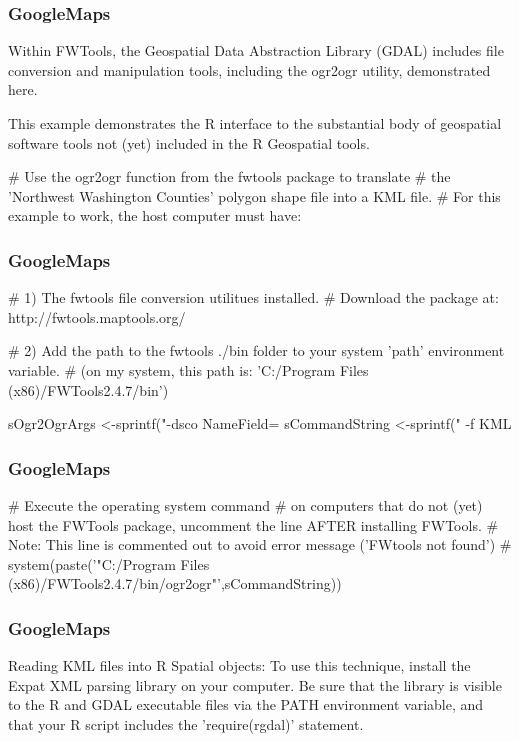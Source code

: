 \documentclass{beamer}
\begin{document}
\begin{frame}[fragile]
\frametitle{GoogleMaps}
Within FWTools, the Geospatial Data Abstraction Library (GDAL) includes file conversion and manipulation tools, including the ogr2ogr utility, demonstrated here.

This example demonstrates the R interface to the substantial body of geospatial software tools not (yet) included in the R Geospatial tools.

# Use the ogr2ogr function from the fwtools package to translate 
# the 'Northwest Washington Counties' polygon shape file into a KML file.
# For this example to work, the host computer must have: 
\end{frame}
\begin{frame}[fragile]
\frametitle{GoogleMaps}
 
# 1) The fwtools file conversion utilitues installed. 
#    Download the package at:   http://fwtools.maptools.org/

# 2) Add the path to the fwtools ./bin folder to your system 'path' environment variable.
#    (on my system, this path is: 'C:/Program Files (x86)/FWTools2.4.7/bin')

   sOgr2OgrArgs <-sprintf("-dsco NameField=%
   sCommandString <-sprintf(" -f KML %
\end{frame}
\begin{frame}[fragile]
\frametitle{GoogleMaps}

# Execute the operating system command
# on computers that do not (yet) host the FWTools package, uncomment the line AFTER installing FWTools.
# Note: This line is commented out to avoid error message ('FWtools not found')   
#   system(paste('"C:/Program Files (x86)/FWTools2.4.7/bin/ogr2ogr"',sCommandString)) 
\end{frame}
\begin{frame}[fragile]
\frametitle{GoogleMaps}
Reading KML files into R Spatial objects:
To use this technique, install the Expat XML parsing library on your computer. Be sure that the library is visible to the R and GDAL executable files via the PATH environment variable, and that your R script includes the 'require(rgdal)' statement. 
\end{frame}
\end{document}
